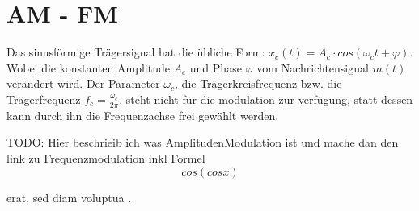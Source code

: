 %
%
%
\section{AM - FM\label{fm:section:teil0}}

Das sinusförmige Trägersignal hat die übliche Form: 
\(x_c(t) = A_c \cdot cos(\omega_ct+\varphi)\).
Wobei die konstanten Amplitude \(A_c\) und Phase \(\varphi\) vom Nachrichtensignal \(m(t)\) verändert wird.
Der Parameter \(\omega_c\), die Trägerkreisfrequenz bzw. die Trägerfrequenz \(f_c = \frac{\omega_c}{2\pi}\),
steht nicht für die modulation zur verfügung, statt dessen kann durch ihn die Frequenzachse frei gewählt werden.
\newblockpunct

TODO:
Hier beschrieib ich was AmplitudenModulation ist und mache dan den link zu Frequenzmodulation inkl Formel \[cos( cos x)\]



erat, sed diam voluptua \cite{fm:bibtex}.


